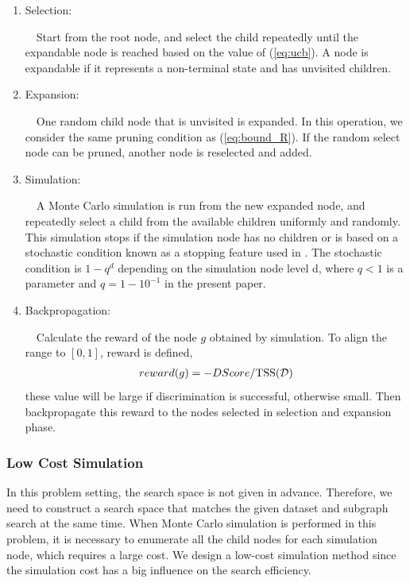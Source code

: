 \begin{enumerate}
	\item{Selection}:

	~~Start from the root node, and select the child repeatedly 
	until the expandable node is reached based on the value of (\ref{eq:ucb}).
	A node is expandable if it represents a non-terminal state and has unvisited children.

	\item{Expansion}:

	~~One random child node that is unvisited is expanded.
	In this operation, we consider the same pruning condition as (\ref{eq:bound_R}). 
	If the random select node can be pruned, another node is reselected and added.

	\item{Simulation}:
	
	~~A Monte Carlo simulation is run from the new expanded node,
	and repeatedly select a child from the available children uniformly and randomly.
	This simulation stops if the simulation node has no children or 
	is based on a stochastic condition known as a stopping feature used in \cite{Romaric:2010}.
	The stochastic condition is $1 - q^{d}$ depending on the simulation node level d,
	where $q < 1$ is a parameter and $q = 1 - 10^{-1}$ in the present paper.
	
	\item{Backpropagation}:

	~~Calculate the reward of the node $g$ obtained by simulation.
	To align the range to $[0, 1]$, reward is defined, 
	\begin{eqnarray}
		reward(g) = -DScore / \mathrm{TSS}(\mathcal{D})
	\end{eqnarray}
	these value will be large if discrimination is successful, otherwise small.
	Then backpropagate this reward to the nodes selected in selection and expansion phase.
\end{enumerate}

\subsubsection*{Low Cost Simulation}
In this problem setting, the search space is not given in advance.
Therefore, we need to construct a search space that matches the given dataset 
and subgraph search at the same time.
When Monte Carlo simulation is performed in this problem, 
it is necessary to enumerate all the child nodes for each simulation node, which requires a large cost.
We design a low-cost simulation method 
since the simulation cost has a big influence on the search efficiency.

